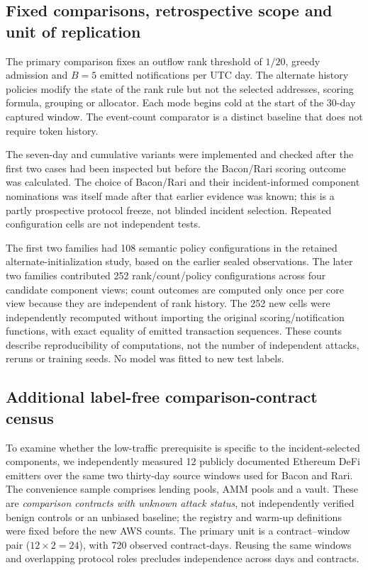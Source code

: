 \documentclass[preprint,12pt,authoryear]{elsarticle}
\begin{document}
\subsection{Fixed comparisons, retrospective scope and unit of replication}
The primary comparison fixes an outflow rank threshold of $1/20$, greedy admission and $B=5$ emitted notifications per UTC day. The alternate history policies modify the state of the rank rule but not the selected addresses, scoring formula, grouping or allocator. Each mode begins cold at the start of the 30-day captured window. The event-count comparator is a distinct baseline that does not require token history.

The seven-day and cumulative variants were implemented and checked after the first two cases had been inspected but before the Bacon/Rari scoring outcome was calculated. The choice of Bacon/Rari and their incident-informed component nominations was itself made after that earlier evidence was known; this is a partly prospective protocol freeze, not blinded incident selection. Repeated configuration cells are not independent tests.

The first two families had 108 semantic policy configurations in the retained alternate-initialization study, based on the earlier sealed observations. The later two families contributed 252 rank/count/policy configurations across four candidate component views; count outcomes are computed only once per core view because they are independent of rank history. The 252 new cells were independently recomputed without importing the original scoring/notification functions, with exact equality of emitted transaction sequences. These counts describe reproducibility of computations, not the number of independent attacks, reruns or training seeds. No model was fitted to new test labels.

\subsection{Additional label-free comparison-contract census}
To examine whether the low-traffic prerequisite is specific to the incident-selected components, we independently measured 12 publicly documented Ethereum DeFi emitters over the same two thirty-day source windows used for Bacon and Rari. The convenience sample comprises lending pools, AMM pools and a vault. These are \emph{comparison contracts with unknown attack status}, not independently verified benign controls or an unbiased baseline; the registry and warm-up definitions were fixed before the new AWS counts. The primary unit is a contract--window pair ($12\times2=24$), with 720 observed contract-days. Reusing the same windows and overlapping protocol roles precludes independence across days and contracts.
\end{document}
